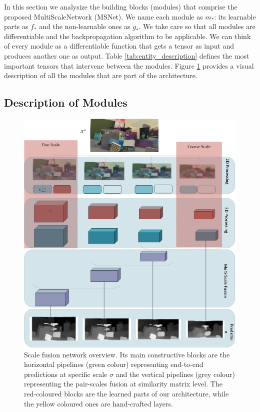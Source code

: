 \documentclass[runningheads]{llncs}
\begin{document}
In this section we analysize the building blocks (modules) that comprise the proposed MultiScaleNetwork (MSNet). We name each module as $m_*$: its learnable parts as $f_*$ and the non-learnable ones as $g_*$. We take care so that all modules are differentiable and the backpropagation algorithm to be applicable. We can think of every module as a differentiable function that gets a tensor as input and produces another one as output. Table \ref{tab:entity_description} defines the most important tensors that intervene between the modules. Figure \ref{fig:cnn_architecture} provides a visual description of all the modules that are part of the architecture.

\subsection{Description of Modules}
\begin{figure}[!htbp]
    \centering
    \includegraphics[width = \textwidth]{figures/stereo_architecture.png}
    \caption{Scale fusion network overview. Its main constructive blocks are the horizontal pipelines (green colour) representing end-to-end predictions at specific scale $\sigma$ and the vertical pipelines (grey colour) representing the pair-scales fusion at similarity matrix level. The red-coloured blocks are the learned parts of our architecture, while the yellow coloured ones are hand-crafted layers.}
    \label{fig:cnn_architecture}
\end{figure}
\end{document}
